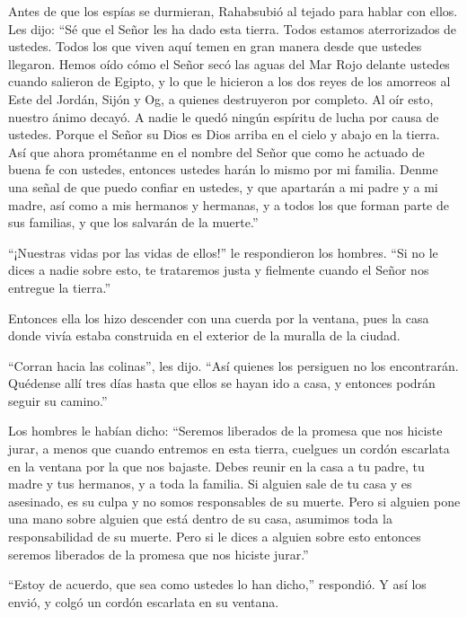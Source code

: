  Antes de que los espías se durmieran, Rahabsubió al tejado
para hablar con ellos.  Les dijo: ``Sé que el Señor les ha
dado esta tierra. Todos estamos aterrorizados de ustedes. Todos los que
viven aquí temen en gran manera desde que ustedes llegaron.
 Hemos oído cómo el Señor secó las aguas del Mar Rojo
delante ustedes cuando salieron de Egipto, y lo que le hicieron a los
dos reyes de los amorreos al Este del Jordán, Sijón y Og, a quienes
destruyeron por completo.  Al oír esto, nuestro ánimo
decayó. A nadie le quedó ningún espíritu de lucha por causa de ustedes.
Porque el Señor su Dios es Dios arriba en el cielo y abajo en la tierra.
 Así que ahora prométanme en el nombre del Señor que como
he actuado de buena fe con ustedes, entonces ustedes harán lo mismo por
mi familia. Denme una señal de que puedo confiar en ustedes,
 y que apartarán a mi padre y a mi madre, así como a mis
hermanos y hermanas, y a todos los que forman parte de sus familias, y
que los salvarán de la muerte.''

 ``¡Nuestras vidas por las vidas de ellos!'' le
respondieron los hombres. ``Si no le dices a nadie sobre esto, te
trataremos justa y fielmente cuando el Señor nos entregue la tierra.''

 Entonces ella los hizo descender con una cuerda por la
ventana, pues la casa donde vivía estaba construida en el exterior de la
muralla de la ciudad.

 ``Corran hacia las colinas'', les dijo. ``Así quienes los
persiguen no los encontrarán. Quédense allí tres días hasta que ellos se
hayan ido a casa, y entonces podrán seguir su camino.''

 Los hombres le habían dicho: ``Seremos liberados de la
promesa que nos hiciste jurar,  a menos que cuando entremos
en esta tierra, cuelgues un cordón escarlata en la ventana por la que
nos bajaste. Debes reunir en la casa a tu padre, tu madre y tus
hermanos, y a toda la familia.  Si alguien sale de tu casa
y es asesinado, es su culpa y no somos responsables de su muerte. Pero
si alguien pone una mano sobre alguien que está dentro de su casa,
asumimos toda la responsabilidad de su muerte.  Pero si le
dices a alguien sobre esto entonces seremos liberados de la promesa que
nos hiciste jurar.''

 ``Estoy de acuerdo, que sea como ustedes lo han dicho,''
respondió. Y así los envió, y colgó un cordón escarlata en su ventana.

